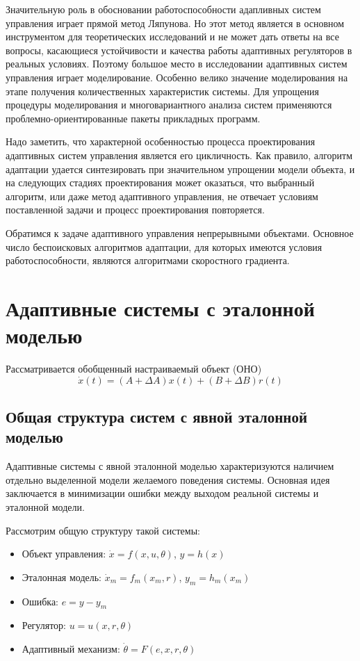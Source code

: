 \documentclass[a4paper,14pt]{extarticle} %
\begin{document}
Значительную роль в обосновании работоспособности адапливных систем управления играет прямой метод Ляпунова. Но этот метод является в основном инструментом для теоретических исследований и не может дать ответы на все вопросы, касающиеся устойчивости и качества работы адаптивных регуляторов в реальных условиях. Поэтому большое место в исследовании адаптивных систем управления играет моделирование. Особенно велико значение моделирования на этапе получения количественных характеристик системы. Для упрощения процедуры моделирования и многовариантного анализа систем применяются проблемно-ориентированные пакеты прикладных программ.

Надо заметить, что характерной особенностью процесса проектирования адаптивных систем управления является его цикличность. Как правило, алгоритм адаптации удается синтезировать при значительном упрощении модели объекта, и на следующих стадиях проектирования может оказаться, что выбранный алгоритм, или даже метод адаптивного управления, не отвечает условиям поставленной задачи и процесс проектирования повторяется.

Обратимся к задаче адаптивного управления непрерывными объектами. Основное число беспоисковых алгоритмов адаптации, для которых имеются условия работоспособности, являются алгоритмами скоростного градиента.

\newpage
\section{Адаптивные системы с эталонной моделью}
Рассматривается обобщенный настраиваемый объект (ОНО)
\begin{equation}
\dot{x}(t) = (A + \Delta A)x(t) + (B + \Delta B)r(t)
\end{equation}

\subsection{Общая структура систем с явной эталонной моделью}
Адаптивные системы с явной эталонной моделью характеризуются наличием отдельно выделенной модели желаемого поведения системы. Основная идея заключается в минимизации ошибки между выходом реальной системы и эталонной модели.

Рассмотрим общую структуру такой системы:

\begin{itemize}
    \item Объект управления: $\dot{x} = f(x, u, \theta)$, $y = h(x)$
    \item Эталонная модель: $\dot{x}_m = f_m(x_m, r)$, $y_m = h_m(x_m)$
    \item Ошибка: $e = y - y_m$
    \item Регулятор: $u = u(x, r, \theta)$
    \item Адаптивный механизм: $\dot{\theta} = F(e, x, r, \theta)$
\end{itemize}
\end{document}

